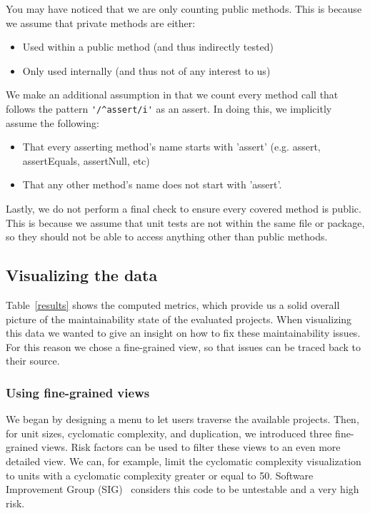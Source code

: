 \documentclass{article}
\begin{document}
You may have noticed that we are only counting public methods. This is because we assume that private methods are either:

\begin{itemize}
\item Used within a public method (and thus indirectly tested)
\item Only used internally (and thus not of any interest to us)
\end{itemize}

We make an additional assumption in that we count every method call that follows the pattern \verb|'/^assert/i'| as an assert. In doing this, we implicitly assume the following:
\begin{itemize}
\item That every asserting method's name starts with 'assert' (e.g. assert, assertEquals, assertNull, etc)
\item That any other method's name does not start with 'assert'.
\end{itemize}

Lastly, we do not perform a final check to ensure every covered method is public. This is because we assume that unit tests are not within the same file or package, so they should not be able to access anything other than public methods.

\subsection{Visualizing the data}
Table~\ref{results} shows the computed metrics, which provide us a solid overall picture of the maintainability state of the evaluated projects.
When visualizing this data we wanted to give an insight on how to fix these maintainability issues. 
For this reason we chose a fine-grained view, so that issues can be traced back to their source.

\subsubsection{Using fine-grained views}
We began by designing a menu to let users traverse the available projects.
Then, for unit sizes, cyclomatic complexity, and duplication, we introduced three fine-grained views.
Risk factors can be used to filter these views to an even more detailed view.
We can, for example, limit the cyclomatic complexity visualization to units with a cyclomatic complexity greater or equal to 50.
Software Improvement Group (SIG)~\cite{SIG} considers this code to be untestable and a very high risk.
\end{document}
